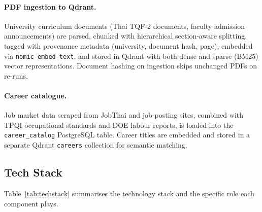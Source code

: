 ﻿\documentclass[12pt,a4paper]{article}
\begin{document}
\paragraph{PDF ingestion to Qdrant.} University curriculum documents (Thai TQF-2
documents, faculty admission announcements) are parsed, chunked with hierarchical
section-aware splitting, tagged with provenance metadata (university, document hash,
page), embedded via \texttt{nomic-embed-text}, and stored in Qdrant with both dense
and sparse (BM25) vector representations. Document hashing on ingestion skips
unchanged PDFs on re-runs.

\paragraph{Career catalogue.} Job market data scraped from JobThai and job-posting
sites, combined with TPQI occupational standards and DOE labour reports, is loaded
into the \texttt{career\_catalog} PostgreSQL table. Career titles are embedded and
stored in a separate Qdrant \texttt{careers} collection for semantic matching.

\subsection{Tech Stack}

Table~\ref{tab:techstack} summarises the technology stack and the specific role each
component plays.
\end{document}
